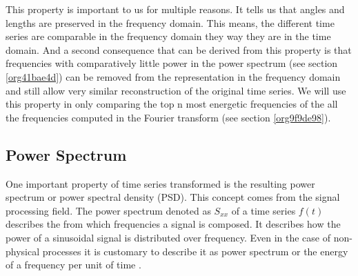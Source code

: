 \documentclass[phd,black, hidelinks]{PrincetonThesis}
\begin{document}
This property is important to us for multiple reasons. It tells us that angles and lengths are preserved in the frequency domain. This means, the different time series are comparable in the frequency domain they way they are in the time domain. And a second consequence that can be derived from this property is that frequencies with comparatively little power in the power spectrum (see section \ref{org41bae4d}) can be removed from the representation in the frequency domain and still allow very similar reconstruction of the original time series. We will use this property in only comparing the top n most energetic frequencies of the all the frequencies computed in the Fourier transform (see section \ref{org9f9de98}).
\subsection{Power Spectrum}
\label{sec:orge5d94e0}
\label{org41bae4d}
One important property of time series transformed is the resulting power spectrum or power spectral density (PSD). This concept comes from the signal processing field. The power spectrum denoted as \(S_{xx}\) of a time series \(f(t)\) describes the from which frequencies a signal is composed. It describes how the power of a sinusoidal signal is distributed over frequency. Even in the case of non-physical processes it is customary to describe it as power spectrum or the energy of a frequency per unit of time \cite{press1992numerical}.
\end{document}
